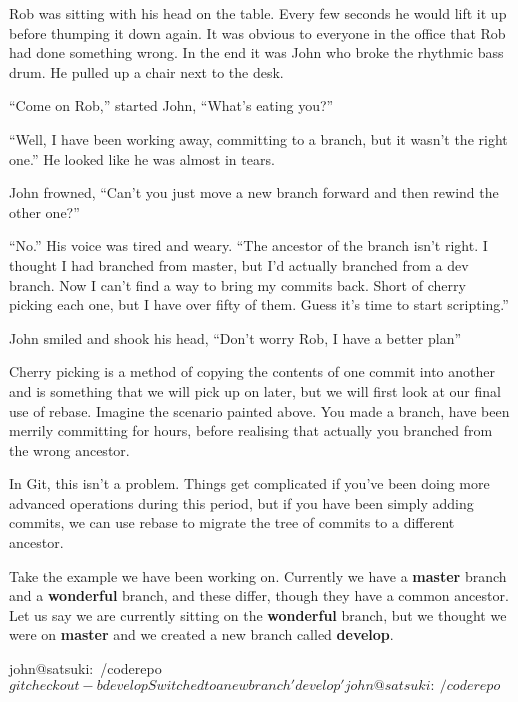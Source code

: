 \begin{trenches}
Rob was sitting with his head on the table.
Every few seconds he would lift it up before thumping it down again.
It was obvious to everyone in the office that Rob had done something wrong.
In the end it was John who broke the rhythmic bass drum.
He pulled up a chair next to the desk.

``Come on Rob,'' started John, ``What's eating you?''

``Well, I have been working away, committing to a branch, but it wasn't the right one.''
He looked like he was almost in tears.

John frowned, ``Can't you just move a new branch forward and then rewind the other one?''

``No.'' His voice was tired and weary.
``The ancestor of the branch isn't right. I thought I had branched from master, but I'd actually branched from a dev branch. Now I can't find a way to bring my commits back. Short of cherry picking each one, but I have over fifty of them. Guess it's time to start scripting.''

John smiled and shook his head, ``Don't worry Rob, I have a better plan''
\end{trenches}

Cherry picking is a method of copying the contents of one commit into another and is something that we will pick up on later, but we will first look at our final use of rebase.
Imagine the scenario painted above.
You made a branch, have been merrily committing for hours, before realising that actually you branched from the wrong ancestor.

In Git, this isn't a problem.
Things get complicated if you've been doing more advanced operations during this period, but if you have been simply adding commits, we can use rebase to migrate the tree of commits to a different ancestor.

Take the example we have been working on. Currently we have a \textbf{master} branch and a \textbf{wonderful} branch, and these differ, though they have a common ancestor.
Let us say we are currently sitting on the \textbf{wonderful} branch, but we thought we were on \textbf{master} and we created a new branch called \textbf{develop}.

\begin{code}
john@satsuki:~/coderepo$ git checkout -b develop
Switched to a new branch 'develop'
john@satsuki:~/coderepo$
\end{code}

